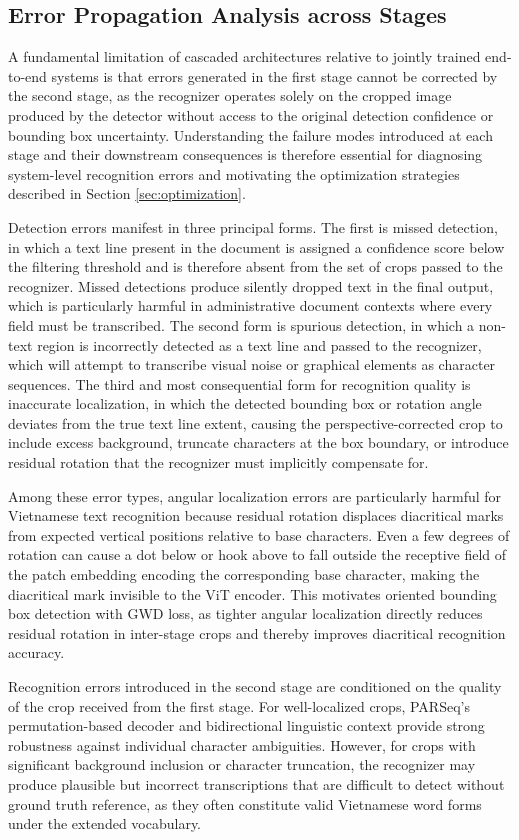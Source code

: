 \subsection{Error Propagation Analysis across Stages}
\label{sec:error_propagation_analysis_across_stages}

A fundamental limitation of cascaded architectures relative to jointly trained end-to-end systems is that errors generated in the first stage cannot be corrected by the second stage, as the recognizer operates solely on the cropped image produced by the detector without access to the original detection confidence or bounding box uncertainty. Understanding the failure modes introduced at each stage and their downstream consequences is therefore essential for diagnosing system-level recognition errors and motivating the optimization strategies described in Section \ref{sec:optimization}.

Detection errors manifest in three principal forms. The first is missed detection, in which a text line present in the document is assigned a confidence score below the filtering threshold and is therefore absent from the set of crops passed to the recognizer. Missed detections produce silently dropped text in the final output, which is particularly harmful in administrative document contexts where every field must be transcribed. The second form is spurious detection, in which a non-text region is incorrectly detected as a text line and passed to the recognizer, which will attempt to transcribe visual noise or graphical elements as character sequences. The third and most consequential form for recognition quality is inaccurate localization, in which the detected bounding box or rotation angle deviates from the true text line extent, causing the perspective-corrected crop to include excess background, truncate characters at the box boundary, or introduce residual rotation that the recognizer must implicitly compensate for.

Among these error types, angular localization errors are particularly harmful for Vietnamese text recognition because residual rotation displaces diacritical marks from expected vertical positions relative to base characters. Even a few degrees of rotation can cause a dot below or hook above to fall outside the receptive field of the patch embedding encoding the corresponding base character, making the diacritical mark invisible to the ViT encoder. This motivates oriented bounding box detection with GWD loss, as tighter angular localization directly reduces residual rotation in inter-stage crops and thereby improves diacritical recognition accuracy.

Recognition errors introduced in the second stage are conditioned on the quality of the crop received from the first stage. For well-localized crops, PARSeq's permutation-based decoder and bidirectional linguistic context provide strong robustness against individual character ambiguities. However, for crops with significant background inclusion or character truncation, the recognizer may produce plausible but incorrect transcriptions that are difficult to detect without ground truth reference, as they often constitute valid Vietnamese word forms under the extended vocabulary.
